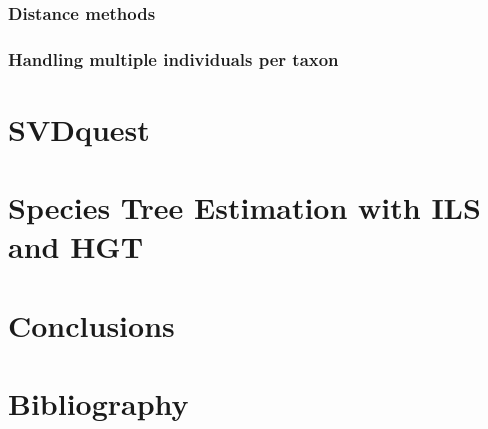 \documentclass[edeposit,fullpage]{uiucthesis2014}
\theoremstyle{definition}
\begin{document}
\subsection{Distance methods}
\subsection{Handling multiple individuals per taxon}


\chapter{SVDquest}


\chapter{Species Tree Estimation with ILS and HGT}



\chapter{Conclusions}

\chapter{Bibliography}
\printbibliography

\appendix*


\backmatter
\end{document}
